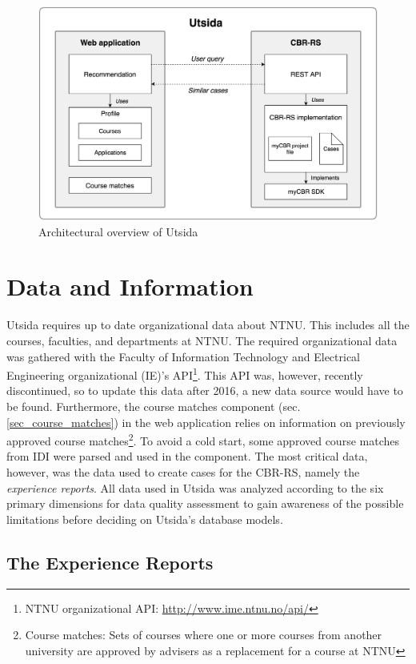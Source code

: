 \begin{figure}[H]
    \centering
    \includegraphics[width=1\textwidth]{fig/system_overview.png}
    \caption{Architectural overview of Utsida}
    \label{fig:system_overview}
\end{figure}

\section{Data and Information}

Utsida requires up to date organizational data about NTNU. This includes all the courses, faculties, and departments at NTNU. The required organizational data was gathered with  the Faculty of Information Technology and Electrical Engineering organizational (IE)'s API\footnote{NTNU organizational API: \url{http://www.ime.ntnu.no/api/}}. This API was, however, recently discontinued, so to update this data after 2016, a new data source would have to be found. Furthermore, the course matches component (sec. \ref{sec_course_matches}) in the web application relies on information on previously approved course matches\footnote{Course matches: Sets of courses where one or more courses from another university are approved by advisers as a replacement for a course at NTNU}. To avoid a cold start, some approved course matches from IDI were parsed and used in the component. The most critical data, however, was the data used to create cases for the CBR-RS, namely the \textit{experience reports}. All data used in Utsida was analyzed according to the six primary dimensions for data quality assessment \cite{askham2013six} to gain awareness of the possible limitations before deciding on Utsida's database models.

\subsection{The Experience Reports}\label{sec:experience_reports}


